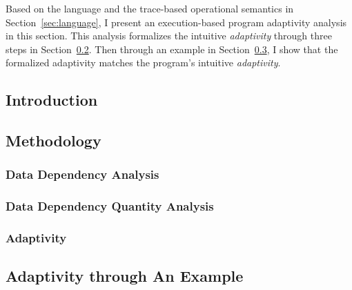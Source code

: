 
Based on the language and the trace-based operational semantics in Section~\ref{sec:language},
I present an execution-based program adaptivity analysis in this section.
This analysis formalizes the intuitive \emph{adaptivity} through three steps in 
Section~\ref{subsec:dynamic-methodology}.
Then through an example in Section~\ref{subsec:dynamic-examples}, I show that the formalized
adaptivity matches the program's intuitive \emph{adaptivity}.

\subsection{Introduction}
\label{subsec:dynamic-intro}


\subsection{Methodology}
\label{subsec:dynamic-methodology}

\subsubsection{Data Dependency Analysis}
\label{sec:dynamic-datadep}

\subsubsection{Data Dependency Quantity Analysis}
\label{sec:dynamic-reachability}
%
\subsubsection{Adaptivity}
\label{sec:dynamic-adapt}
%
%
\subsection{Adaptivity through An Example}
\label{subsec:dynamic-examples}

%

% 
%
%